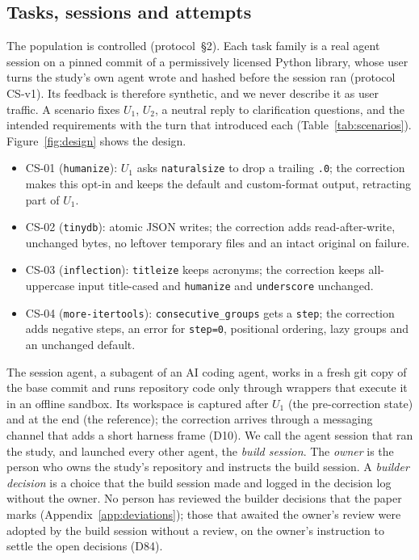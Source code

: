 \subsection{Tasks, sessions and attempts}
\label{sec:design-tasks}
The population is controlled (protocol~\S2). Each task family is a real agent session on a pinned commit of a permissively licensed Python library, whose user turns the study's own agent wrote and hashed before the session ran (protocol CS-v1). Its feedback is therefore synthetic, and we never describe it as user traffic. A scenario fixes $U_1$, $U_2$, a neutral reply to clarification questions, and the intended requirements with the turn that introduced each (Table~\ref{tab:scenarios}). Figure~\ref{fig:design} shows the design.
\begin{itemize}
\item CS-01 (\texttt{humanize}): $U_1$ asks \texttt{naturalsize} to drop a trailing \texttt{.0}; the correction makes this opt-in and keeps the default and custom-format output, retracting part of $U_1$.
\item CS-02 (\texttt{tinydb}): atomic JSON writes; the correction adds read-after-write, unchanged bytes, no leftover temporary files and an intact original on failure.
\item CS-03 (\texttt{inflection}): \texttt{titleize} keeps acronyms; the correction keeps all-uppercase input title-cased and \texttt{humanize} and \texttt{underscore} unchanged.
\item CS-04 (\texttt{more-itertools}): \texttt{consecutive\_groups} gets a \texttt{step}; the correction adds negative steps, an error for \texttt{step=0}, positional ordering, lazy groups and an unchanged default.
\end{itemize}
The session agent, a subagent of an AI coding agent, works in a fresh git copy of the base commit and runs repository code only through wrappers that execute it in an offline sandbox. Its workspace is captured after $U_1$ (the pre-correction state) and at the end (the reference); the correction arrives through a messaging channel that adds a short harness frame (D10). We call the agent session that ran the study, and launched every other agent, the \emph{build session}. The \emph{owner} is the person who owns the study's repository and instructs the build session. A \emph{builder decision} is a choice that the build session made and logged in the decision log without the owner. No person has reviewed the builder decisions that the paper marks
(Appendix~\ref{app:deviations}); those that awaited the owner's review were adopted by the build session without a
review, on the owner's instruction to settle the open decisions (D84).

